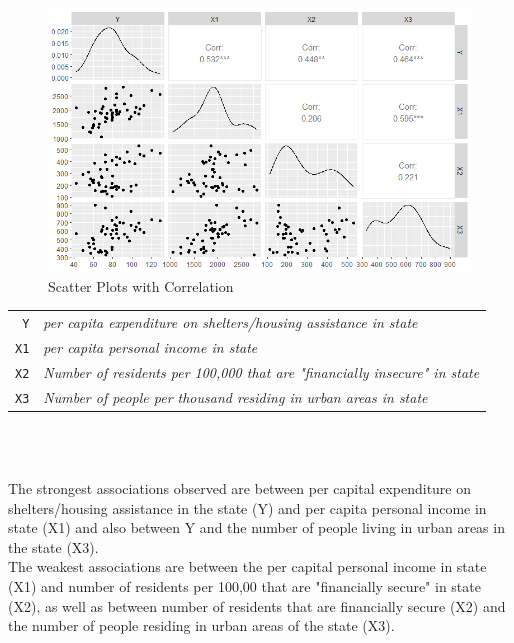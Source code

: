 \documentclass[12pt,letterpaper]{article}
\begin{document}
\begin{figure}[H] %
	
	\centering
\includegraphics[scale=0.75]{Rplot06_GG.png}
\caption{Scatter Plots with Correlation}
\label{fig:scatterplot}
\newpage
\end{figure} 
	
\begin{tabular}{r|l}
	\texttt{Y} & \emph{per capita expenditure on shelters/housing assistance in state}\\
	\texttt{X1} &\emph{per capita personal income in state} \\
	\texttt{X2} &  \emph{Number of residents per 100,000 that are "financially insecure" in state}\\
	\texttt{X3} &  \emph{Number of people per thousand residing in urban areas in state} \\
\end{tabular} \\

\
\

\noindent The strongest associations observed are between per capital expenditure on shelters/housing assistance in the state (Y) and per capita personal income in state (X1) and also between Y and the number of people living in urban areas in the state (X3). \\

\noindent The weakest associations are between the per capital personal income in state (X1) and number of residents per 100,00 that are "financially secure" in state (X2), as well as between number of residents that are financially secure (X2) and the number of people residing in urban areas of the state (X3).\\
\end{document}

